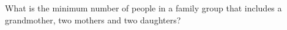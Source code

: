 What is the minimum number of people in a family group that includes a grandmother, two mothers and two daughters?

